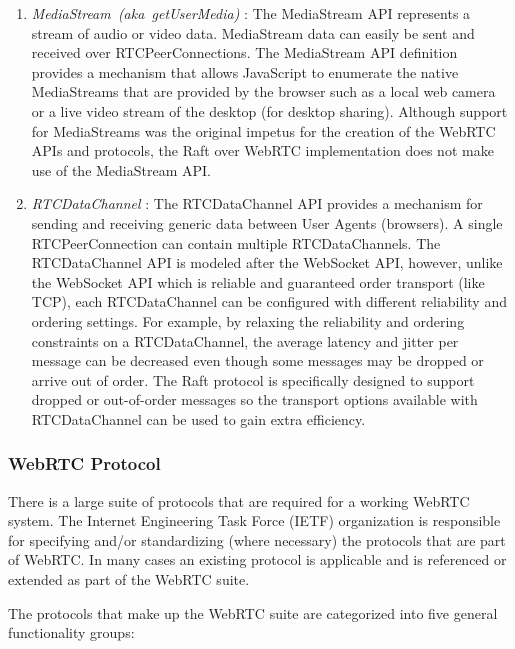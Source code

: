 \documentclass[9pt]{extarticle}
\begin{document}
\begin{multicols}{2}
\begin{enumerate}
\item \emph{MediaStream~(aka~getUserMedia)} \cite{webrtc:media-stream:feb2015}:
    The MediaStream API represents a stream of audio or video data.
    MediaStream data can easily be sent and received over
    RTCPeerConnections. The MediaStream API definition provides
    a mechanism that allows JavaScript to enumerate the native
    MediaStreams that are provided by the browser such as a local web
    camera or a live video stream of the desktop (for desktop
    sharing).  Although support for MediaStreams was the original
    impetus for the creation of the WebRTC APIs and protocols, the
    Raft over WebRTC implementation does not make use of the
    MediaStream API.

\item
    \emph{RTCDataChannel} \cite{webrtc:datachannel:feb2015}:
    The RTCDataChannel API provides a mechanism for sending and
    receiving generic data between User Agents (browsers). A single
    RTCPeerConnection can contain multiple RTCDataChannels. The
    RTCDataChannel API is modeled after the WebSocket API, however,
    unlike the WebSocket API which is reliable and guaranteed order
    transport (like TCP), each RTCDataChannel can be configured with
    different reliability and ordering settings. For example, by
    relaxing the reliability and ordering constraints on
    a RTCDataChannel, the average latency and jitter per message can
    be decreased even though some messages may be dropped or arrive
    out of order. The Raft protocol is specifically designed to
    support dropped or out-of-order messages so the transport options
    available with RTCDataChannel can be used to gain extra
    efficiency.
\end{enumerate}


\subsubsection{WebRTC Protocol}

There is a large suite of protocols that are required for a working
WebRTC system. The Internet Engineering Task Force (IETF) organization
is responsible for specifying and/or standardizing (where necessary)
the protocols that are part of WebRTC. In many cases an existing
protocol is applicable and is referenced or extended as part of the
WebRTC suite. %

The protocols that make up the WebRTC suite are categorized into
five general functionality groups:


\end{multicols}
\end{document}
